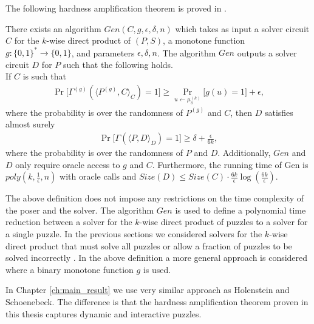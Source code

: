 The following hardness amplification theorem is proved in \cite{holenstein2011general}.
\begin{theorem}
There exists an algorithm $\mathit{Gen}(C,g,\epsilon, \delta, n)$ which takes as input a solver circuit $C$ for the $k$-wise
direct product of $(P,S)$, a monotone function $g: \{0,1\}^{*} \rightarrow \{0,1\}$, and parameters $\epsilon,\delta,n$.
The algorithm $\mathit{Gen}$ outputs a solver circuit $D$ for $P$ such that the following holds. \\
If $C$ is such that
\begin{align*}
\Pr\Big[\Gamma^{(g)}(\langle P^{(g)}, C \rangle_C) = 1\Big] \geq \Pr_{u \leftarrow \mu_{\delta}^{(k)}} \Big[ g(u) = 1 \Big] + \epsilon,
\end{align*}
where the probability is over the randomness of $P^{(g)}$ and $C$, then $D$ satisfies almost surely
\begin{align*}
  \Pr\Big[ \Gamma(\langle P, D\rangle_{D}) = 1\Big] \geq \delta + \frac{\epsilon}{6k},
\end{align*}
where the probability is over the randomness of $P$ and $D$.
Additionally, $\mathit{Gen}$ and $D$ only require oracle access to $g$ and $C$.
Furthermore, the running time of Gen is $poly(k, \frac{1}{\epsilon}, n)$ with oracle calls and $\mathit{Size}(D) \leq \mathit{Size}(C)\cdot\frac{6k}{\epsilon}\log(\frac{6k}{\epsilon})$.
\end{theorem}

The above definition does not impose any restrictions on the time complexity of the poser and the solver.
The algorithm $\mathit{Gen}$ is used to define a polynomial time reduction between a solver for the $k$-wise direct product of puzzles to a solver for a single puzzle.
In the previous sections we considered solvers for the $k$-wise direct product that
must solve all puzzles \cite{canetti2005hardness} or allow a fraction of puzzles to be solved incorrectly \cite{dodis2009security}.
In the above definition a more general approach is considered where a binary monotone function $g$ is used.

In Chapter \ref{ch:main_result} we use very similar approach as Holenstein and Schoenebeck.
The difference is that the hardness amplification theorem proven in this thesis captures dynamic and interactive puzzles.



